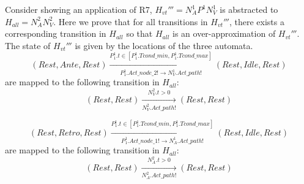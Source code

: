 Consider  showing an application of R7, $H_{vt}'''=N^1_AP^1N^1_V$ is abstracted to $H_{all}=N^2_AN^2_V$. Here we prove that for all transitions in $H_{vt}'''$, there exists a corresponding transition in $H_{all}$ so that $H_{all}$ is an over-approximation of $H_{vt}'''$. 
The state of $H_{vt}'''$ is given by the locations of the three automata.
%
$$(Rest,Ante,Rest)\xrightarrow[P^1_1.Act\_node\_2!\rightarrow N^1_V.Act\_path!]{P^1_1.t\in [P^1_1.Tcond\_min, P^1_1.Tcond\_max] }(Rest,Idle,Rest)$$
are mapped to the following transition in $H_{all}$:
$$(Rest,Rest)\xrightarrow[N^2_V.Act\_path!]{N^2_V.t>0}(Rest,Rest)$$

$$(Rest,Retro,Rest)\xrightarrow[P^1_1.Act\_node\_1!\rightarrow N^1_A.Act\_path!]{P^1_1.t\in [P^1_1.Tcond\_min, P^1_1.Tcond\_max] }(Rest,Idle,Rest)$$
are mapped to the following transition in $H_{all}$:
$$(Rest,Rest)\xrightarrow[N^2_A.Act\_path!]{N^2_A.t>0}(Rest,Rest)$$


%




